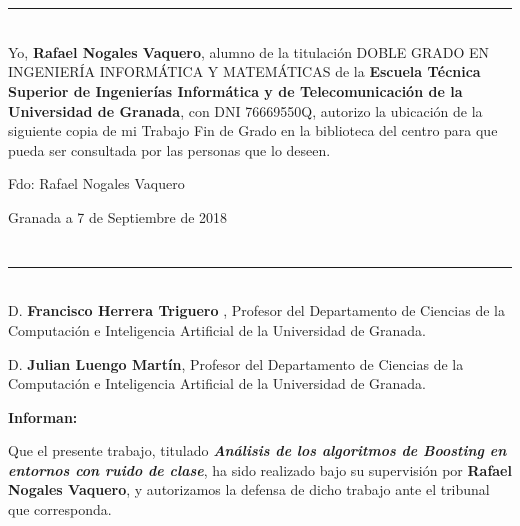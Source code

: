 \chapter*{}
\thispagestyle{empty}

\noindent\rule[-1ex]{\textwidth}{2pt}\\[4.5ex]

Yo, \textbf{Rafael Nogales Vaquero}, alumno de la titulación DOBLE GRADO EN INGENIERÍA INFORMÁTICA Y MATEMÁTICAS de la \textbf{Escuela Técnica Superior
de Ingenierías Informática y de Telecomunicación de la Universidad de Granada}, con DNI 76669550Q, autorizo la
ubicación de la siguiente copia de mi Trabajo Fin de Grado en la biblioteca del centro para que pueda ser
consultada por las personas que lo deseen.

\vspace{6cm}

\noindent Fdo: Rafael Nogales Vaquero

\vspace{2cm}

\begin{flushright}
Granada a 7 de Septiembre de 2018
\end{flushright}


\chapter*{}
\thispagestyle{empty}

\noindent\rule[-1ex]{\textwidth}{2pt}\\[4.5ex]

D. \textbf{Francisco Herrera Triguero  }, Profesor del Departamento de Ciencias de la Computación e Inteligencia Artificial  de la Universidad de Granada.

\vspace{0.5cm}

D. \textbf{Julian Luengo Martín}, Profesor del Departamento de Ciencias de la Computación e Inteligencia Artificial  de la Universidad de Granada.


\vspace{0.5cm}

\textbf{Informan:}

\vspace{0.5cm}

Que el presente trabajo, titulado \textit{\textbf{Análisis de los algoritmos de Boosting en entornos con ruido de clase}},
ha sido realizado bajo su supervisión por \textbf{Rafael Nogales Vaquero}, y autorizamos la defensa de dicho trabajo ante el tribunal
que corresponda.

